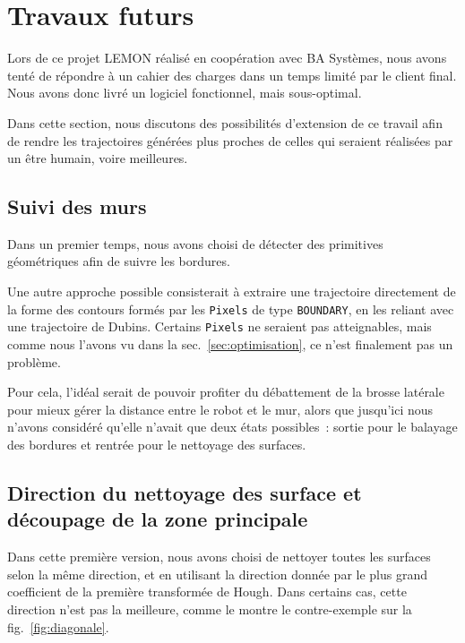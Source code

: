 \documentclass[french,A4paper,]{book}
\begin{document}
\section{Travaux futurs}\label{sec:lemonfutur}

Lors de ce projet LEMON réalisé en coopération avec BA Systèmes, nous
avons tenté de répondre à un cahier des charges dans un temps limité par
le client final. Nous avons donc livré un logiciel fonctionnel, mais
sous-optimal.

Dans cette section, nous discutons des possibilités d'extension de ce
travail afin de rendre les trajectoires générées plus proches de celles
qui seraient réalisées par un être humain, voire meilleures.

\subsection{Suivi des murs}\label{suivi-des-murs}

Dans un premier temps, nous avons choisi de détecter des primitives
géométriques afin de suivre les bordures.

Une autre approche possible consisterait à extraire une trajectoire
directement de la forme des contours formés par les \texttt{Pixels} de
type \texttt{BOUNDARY}, en les reliant avec une trajectoire de Dubins.
Certains \texttt{Pixels} ne seraient pas atteignables, mais comme nous
l'avons vu dans la sec.~\ref{sec:optimisation}, ce n'est finalement pas
un problème.

Pour cela, l'idéal serait de pouvoir profiter du débattement de la
brosse latérale pour mieux gérer la distance entre le robot et le mur,
alors que jusqu'ici nous n'avons considéré qu'elle n'avait que deux
états possibles~: sortie pour le balayage des bordures et rentrée pour
le nettoyage des surfaces.

\subsection{Direction du nettoyage des surface et découpage de la zone
principale}\label{direction-du-nettoyage-des-surface-et-duxe9coupage-de-la-zone-principale}

Dans cette première version, nous avons choisi de nettoyer toutes les
surfaces selon la même direction, et en utilisant la direction donnée
par le plus grand coefficient de la première transformée de Hough. Dans
certains cas, cette direction n'est pas la meilleure, comme le montre le
contre-exemple sur la fig.~\ref{fig:diagonale}.
\end{document}
